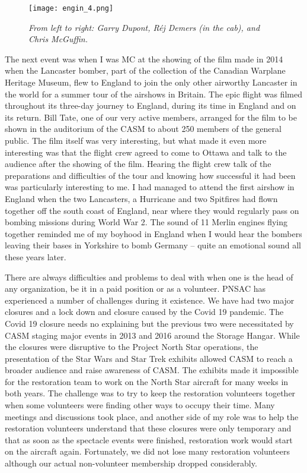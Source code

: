 \begin{figure}[H]
   \vspace{2em}
   \centering
   \texttt{[image: engin\_4.png]}
   \caption*{\small \em From left to right: Garry Dupont, R\'{e}j Demers (in the cab), and Chris McGuffin.}
   \label{fig:img1}
\end{figure}


The next event was when I was MC at the showing of the film  made in 2014 when the  Lancaster bomber, part of the collection of the Canadian Warplane Heritage Museum, flew to England to join the only other airworthy Lancaster in the world for a summer tour of the airshows in Britain. The epic flight was filmed throughout its three-day journey to England, during its time in England and on its return.  Bill Tate, one of our very active members, arranged for the film to be shown in the auditorium of the CASM to about 250 members of the general public.  The film itself was very interesting, but what made it even more interesting was that the flight crew agreed to come to Ottawa and talk to the audience after the showing of the film.  Hearing the flight crew talk of the preparations and difficulties of the tour and knowing how successful it had been was particularly interesting to me.  I had managed to attend the first airshow in England when the two Lancasters, a Hurricane and two Spitfires had flown together off the south coast of England, near where they would regularly pass on bombing missions during World War 2. The sound of 11 Merlin engines flying together reminded me of my boyhood in England when I would hear the bombers leaving their bases in Yorkshire to bomb Germany – quite an emotional sound all these years later.

There are always difficulties and problems to deal with when one is the head of any organization, be it in a paid position or as a volunteer.  PNSAC has experienced a  number of challenges during it existence.  We have had two major closures and a lock down and closure caused by the Covid 19 pandemic.  The Covid 19 closure needs no explaining but the previous two were necessitated by CASM staging major events in 2013 and 2016 around the Storage Hangar.  While the closures were disruptive to the Project North Star operations, the presentation of the Star Wars and Star Trek exhibits allowed CASM to reach a broader audience and raise awareness of CASM. The exhibits made it impossible for the restoration team to work on the North Star aircraft for many weeks in both years.  The challenge was to try to keep the restoration volunteers together when some volunteers were finding other ways to occupy their time.  Many meetings and discussions took place, and another side of my role was to help the restoration volunteers understand that these closures were only temporary and that as soon as the spectacle events were finished, restoration work would start on the aircraft again.  Fortunately, we did not lose many restoration volunteers although our actual non-volunteer membership dropped considerably.

